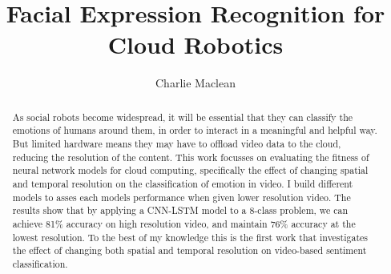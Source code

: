 \documentclass[sigconf]{acmart}
\begin{document}
\title{Facial Expression Recognition for Cloud Robotics}

\author{Charlie Maclean}


\renewcommand{\shortauthors}{Charlie Maclean}

\begin{abstract}

As social robots become widespread, it will be essential that they can
classify the emotions of humans around them, in order to interact in a
meaningful and helpful way. But limited hardware means they
may have to offload video data to the cloud, reducing the resolution of the
content. This work focusses on evaluating the fitness of neural network models
for cloud computing, specifically the effect of changing spatial and temporal 
resolution on the
classification of emotion in video. I build different models to asses each
models performance when given lower resolution video. The results show that by
applying a CNN-LSTM model to a 8-class problem, we can achieve 81\% accuracy on high resolution
video, and maintain 76\% accuracy at the lowest resolution. To the best of
my knowledge this is the first work that investigates the effect of changing
both spatial and temporal resolution on video-based sentiment classification.

\end{abstract}



\maketitle
\end{document}

